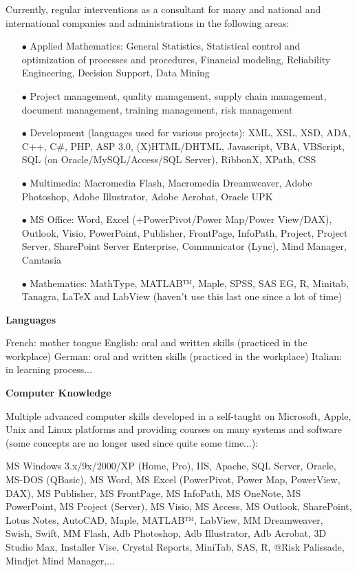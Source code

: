 Currently, regular interventions as a consultant for many and national and international companies and administrations in the following areas:
\begin{itemize}	 
	\item[$\bullet$] Applied Mathematics: General Statistics, Statistical control and optimization of processes and procedures, Financial modeling, Reliability Engineering, Decision Support, Data Mining

	\item[$\bullet$] Project management, quality management, supply chain management, document management, training management, risk management

	\item[$\bullet$] Development (languages used for various projects): XML, XSL, XSD, ADA, C++, C\#, PHP, ASP 3.0, (X)HTML/DHTML, Javascript, VBA, VBScript, SQL (on Oracle/MySQL/Access/SQL Server), RibbonX, XPath, CSS

	\item[$\bullet$] Multimedia: Macromedia Flash, Macromedia Dreamweaver, Adobe Photoshop, Adobe Illustrator, Adobe Acrobat, Oracle UPK

	\item[$\bullet$] MS Office: Word, Excel (+PowerPivot/Power Map/Power View/DAX), Outlook, Visio, PowerPoint, Publisher, FrontPage, InfoPath, Project, Project Server, SharePoint Server Enterprise, Communicator (Lync), Mind Manager, Camtasia

	\item[$\bullet$] Mathematics: MathType, MATLAB™, Maple, SPSS, SAS EG, R, Minitab, Tanagra, LaTeX and LabView (haven't use this last one since a lot of time)
\end{itemize}
\textbf{Languages}

French: mother tongue
English: oral and written skills (practiced in the workplace)
German: oral and written skills (practiced in the workplace)
Italian: in learning process...

\textbf{Computer Knowledge}

Multiple advanced computer skills developed in a self-taught on Microsoft, Apple, Unix and Linux platforms and providing courses on many systems and software (some concepts are no longer used since quite some time...):

MS Windows 3.x/9x/2000/XP (Home, Pro), IIS, Apache, SQL Server, Oracle, MS-DOS (QBasic), MS Word, MS Excel (PowerPivot, Power Map, PowerView, DAX), MS Publisher, MS FrontPage, MS InfoPath, MS OneNote, MS PowerPoint, MS Project (Server), MS Visio, MS Access, MS Outlook, SharePoint, Lotus Notes, AutoCAD, Maple, MATLAB™, LabView, MM Dreamweaver, Swish, Swift, MM Flash, Adb Photoshop, Adb Illustrator, Adb Acrobat, 3D Studio Max, Installer Vise, Crystal Reports, MiniTab, SAS, R, @Risk Palissade, Mindjet Mind Manager,...


